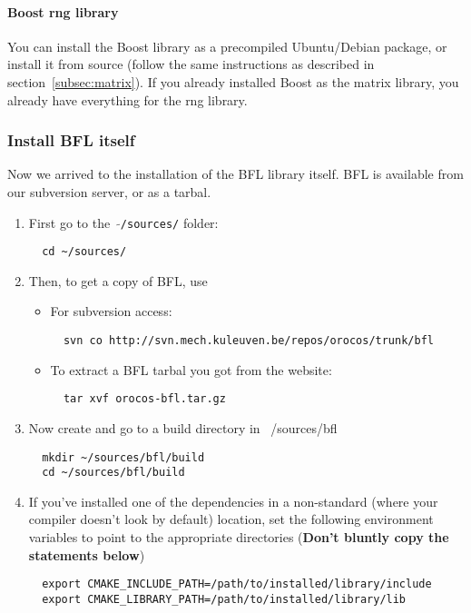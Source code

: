 \documentclass[a4paper,10pt]{article}
\begin{document}
\paragraph{Boost rng library}
You can install the Boost library as a precompiled Ubuntu/Debian
package, or install it from source (follow the same instructions as
described in section~\ref{subsec:matrix}). If you already installed Boost
as the matrix library, you already have everything for the rng library.

\subsubsection{Install BFL itself}
Now we arrived to the installation of the BFL library itself. BFL is
available from our subversion server, or as a tarbal.
\begin{enumerate}
\item First go to the \ $\mathtt{\tilde{ }}$\texttt{/sources/} folder:
\begin{verbatim}
  cd ~/sources/
\end{verbatim}
\item Then, to get a copy of BFL, use
 \begin{itemize}
 \item For subversion access:
\begin{verbatim}
  svn co http://svn.mech.kuleuven.be/repos/orocos/trunk/bfl
\end{verbatim}
 \item To extract a BFL tarbal you got from the website:
\begin{verbatim}
  tar xvf orocos-bfl.tar.gz
\end{verbatim}
\end{itemize}
\item Now create and go to a build directory in ~/sources/bfl
\begin{verbatim}
  mkdir ~/sources/bfl/build
  cd ~/sources/bfl/build
\end{verbatim}
\item If you've installed one of the dependencies in a non-standard
  (where your compiler doesn't look by default) location, set the
  following environment variables to point to the appropriate
  directories (\textbf{Don't bluntly copy the statements below})
\begin{verbatim}
  export CMAKE_INCLUDE_PATH=/path/to/installed/library/include
  export CMAKE_LIBRARY_PATH=/path/to/installed/library/lib
\end{verbatim}

\end{enumerate}
\end{document}
